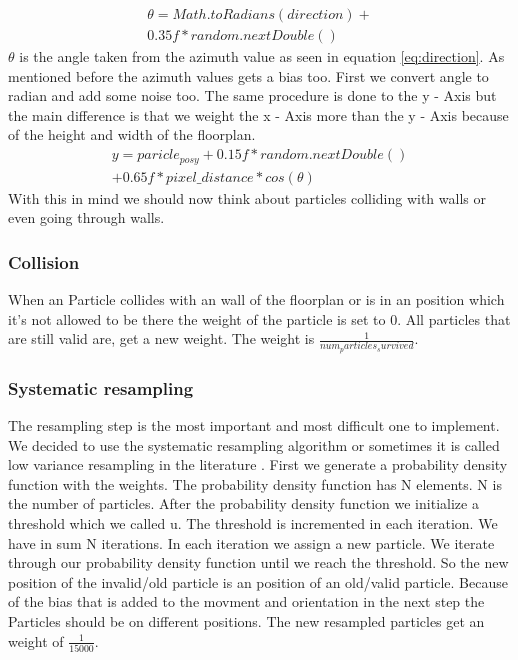 \documentclass[conference]{IEEEtran}
\begin{document}
\begin{equation*}
\label{eq:direction}
\begin{aligned}
\theta = Math.toRadians(direction) +\\ 0.35f * random.nextDouble()
\end{aligned}
\end{equation*}
$\theta$ is the angle taken from the azimuth value as seen in equation \ref{eq:direction}. As mentioned before the azimuth values gets a bias too. First we convert angle to radian and add some noise too.
The same procedure is done to the y - Axis but the main difference is that we weight the x - Axis more than the y - Axis because of the height and width of the floorplan.
\begin{equation*}
\label{eq:y}
\begin{aligned}
y = paricle_{posy} + 0.15f * random.nextDouble() \\ + 0.65f * pixel\_distance * cos(\theta)
\end{aligned}
\end{equation*}
With this in mind we should now think about particles colliding with walls or even going through walls.\\
\subsubsection{Collision}
When an Particle collides with an wall of the floorplan or is in an position which it's not allowed to be there the weight of the particle is set to 0. All particles that are still valid are, get a new weight. The weight is  $\frac{1}{num_particles_survived} $. \\
\subsubsection{Systematic resampling}
The resampling step is the most important and most difficult one to implement. We decided to use the systematic resampling algorithm or sometimes it is called low variance resampling in the literature \cite{b3}. First we generate a probability density function with the weights. The probability density function has N elements. N is the number of particles. After the probability density function we initialize a threshold which we called u. The threshold is incremented in each iteration. We have in sum N iterations. In each iteration we assign a new particle.  We iterate through our probability density function until we reach the threshold. So the new position of the invalid/old particle is an position of an old/valid particle. 
Because of the bias that is added to the movment and orientation in the next step the Particles should be on different positions. The new resampled particles get an weight of $\frac{1}{15000}$. \\
\end{document}
